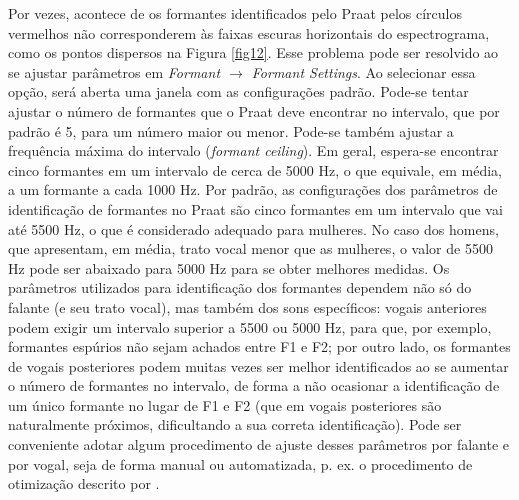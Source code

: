 \documentclass[portuguese]{textolivre}
\begin{document}
Por vezes, acontece de os formantes identificados pelo Praat pelos círculos vermelhos não corresponderem às faixas escuras horizontais do espectrograma, como os pontos dispersos na Figura \ref{fig12}. Esse problema pode ser resolvido ao se ajustar parâmetros em \textit{Formant $\rightarrow$ Formant Settings}. Ao selecionar essa opção, será aberta uma janela com as configurações padrão. Pode-se tentar ajustar o número de formantes que o Praat deve encontrar no intervalo, que por padrão é 5, para um número maior ou menor. Pode-se também ajustar a frequência máxima do intervalo (\textit{formant ceiling}). Em geral, espera-se encontrar cinco formantes em um intervalo de cerca de 5000 Hz, o que equivale, em média, a um formante a cada 1000 Hz. Por padrão, as configurações dos parâmetros de identificação de formantes no Praat são cinco formantes em um intervalo que vai até 5500 Hz, o que é considerado adequado para mulheres. No caso dos homens, que apresentam, em média, trato vocal menor que as mulheres, o valor de 5500 Hz pode ser abaixado para 5000 Hz para se obter melhores medidas. Os parâmetros utilizados para identificação dos formantes dependem não só do falante (e seu trato vocal), mas também dos sons específicos: vogais anteriores podem exigir um intervalo superior a 5500 ou 5000 Hz, para que, por exemplo, formantes espúrios não sejam achados entre F1 e F2; por outro lado, os formantes de vogais posteriores podem muitas vezes ser melhor identificados ao se aumentar o número de formantes no intervalo, de forma a não ocasionar a identificação de um único formante no lugar de F1 e F2 (que em vogais posteriores são naturalmente próximos, dificultando a sua correta identificação). Pode ser conveniente adotar algum procedimento de ajuste desses parâmetros por falante e por vogal, seja de forma manual ou automatizada, p. ex. o procedimento de otimização descrito por \textcite[s.~2E]{escudero_2009}.
\end{document}
